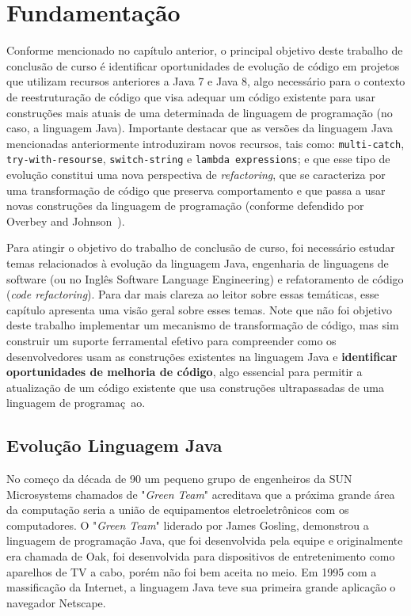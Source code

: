 %
%
\chapter{Fundamentação}

Conforme mencionado no capítulo anterior, o principal objetivo deste trabalho de conclusão de curso é 
identificar oportunidades de evolução de código em projetos que utilizam recursos anteriores a Java 7 e Java 8, 
algo necess\'{a}rio para o contexto de reestrutura\c c\~{a}o de c\'{o}digo que visa adequar um c\'{o}digo 
existente para usar constru\c c\~{o}es mais atuais de uma determinada de linguagem de programa\c c\~{a}o 
(no caso, a linguagem Java). Importante destacar que as vers\~{o}es da linguagem Java mencionadas anteriormente
introduziram novos recursos, tais como: \texttt{multi-catch}, \texttt{try-with-resourse}, \texttt{switch-string} 
e \texttt{lambda expressions}; e que esse tipo de evolução constitui uma nova perspectiva de \textit{refactoring}, que se caracteriza 
por uma transforma\c c\~{a}o de c\'{o}digo que preserva comportamento e que passa a usar  
novas constru\c c\~{o}es da linguagem de programa\c c\~{a}o (conforme defendido por Overbey and Johnson~\cite{Overbey:2009}). 

Para atingir o objetivo do trabalho de conclus\~{a}o de curso, foi necess\'{a}rio estudar temas relacionados 
\`{a} evolu\c c\~{a}o da linguagem Java, engenharia de linguagens de software (ou no Ingl\^{e}s Software 
Language Engineering) e refatoramento de c\'{o}digo (\emph{code refactoring}).  Para dar mais clareza ao leitor 
sobre essas temáticas, esse capítulo apresenta uma vis\~{a}o geral sobre esses temas. Note que n\~{a}o foi objetivo
deste trabalho implementar um mecanismo de transforma\c c\~{a}o de c\'{o}digo, mas sim construir um suporte ferramental 
efetivo para compreender como os desenvolvedores usam as constru\c c\~{o}es existentes na linguagem Java e {\bf identificar 
oportunidades de melhoria de c\'{o}digo}, algo essencial para permitir a atualiza\c c\~{a}o de um c\'{o}digo existente 
que usa constru\c c\~{o}es ultrapassadas de uma linguagem de programa\c c~{a}o. 
 
\section{Evolução Linguagem Java}\label{sec:evolucaoJava}

No começo da década de 90 um pequeno grupo de engenheiros da SUN Microsystems chamados de "\textit{Green Team}" acreditava que a próxima grande área da computação seria a união de equipamentos eletroeletrônicos com os computadores. O "\textit{Green Team}" liderado por James Gosling, demonstrou a linguagem de programação Java, que foi desenvolvida pela equipe e originalmente era chamada de Oak, foi desenvolvida para dispositivos de entretenimento como aparelhos de TV a cabo, porém não foi bem aceita no meio. Em 1995 com a massificação da Internet, a linguagem Java teve sua primeira grande aplicação o navegador Netscape.

